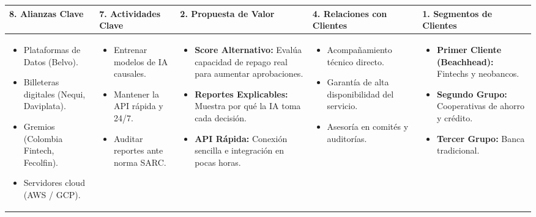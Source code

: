 \documentclass[11pt,a4paper]{article}
\begin{document}
\begin{table}[h!]
\centering
\small
\begin{tabularx}{\linewidth}{|X|X|X|X|X|}
\hline
\rowcolor{lightgray}
\textbf{8. Alianzas Clave} & 
\textbf{7. Actividades Clave} & 
\textbf{2. Propuesta de Valor} & 
\textbf{4. Relaciones con Clientes} & 
\textbf{1. Segmentos de Clientes} \\ 
\hline
\begin{itemize}[leftmargin=*]
    \item Plataformas de Datos (Belvo).
    \item Billeteras digitales (Nequi, Daviplata).
    \item Gremios (Colombia Fintech, Fecolfin).
    \item Servidores cloud (AWS / GCP).
\end{itemize} & 
\begin{itemize}[leftmargin=*]
    \item Entrenar modelos de IA causales.
    \item Mantener la API rápida y 24/7.
    \item Auditar reportes ante norma SARC.
\end{itemize} & 
\begin{itemize}[leftmargin=*]
    \item \textbf{Score Alternativo:} Evalúa capacidad de repago real para aumentar aprobaciones.
    \item \textbf{Reportes Explicables:} Muestra por qué la IA toma cada decisión.
    \item \textbf{API Rápida:} Conexión sencilla e integración en pocas horas.
\end{itemize} & 
\begin{itemize}[leftmargin=*]
    \item Acompañamiento técnico directo.
    \item Garantía de alta disponibilidad del servicio.
    \item Asesoría en comités y auditorías.
\end{itemize} & 
\begin{itemize}[leftmargin=*]
    \item \textbf{Primer Cliente (Beachhead):} Fintechs y neobancos.
    \item \textbf{Segundo Grupo:} Cooperativas de ahorro y crédito.
    \item \textbf{Tercer Grupo:} Banca tradicional.
\end{itemize} \\

\end{tabularx}
\end{table}
\end{document}
